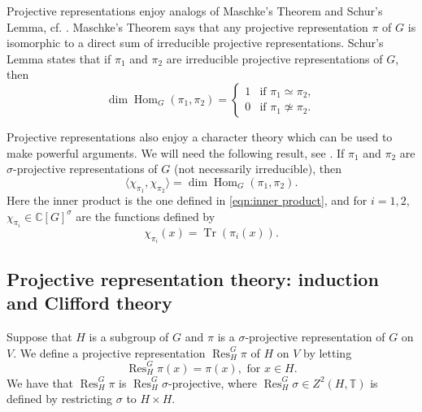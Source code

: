 \documentclass[11pt, oneside, reqno]{amsart}
\newcommand{\bbC}{\mathbb{C}}
\newcommand{\bbT}{\mathbb{T}}
\newcommand{\Tr}{\operatorname{Tr}}
\newcommand{\Hom}{\operatorname{Hom}}
\newcommand{\Res}{\operatorname{Res}}
\theoremstyle{definition}
\theoremstyle{plain}
\theoremstyle{remark}
\begin{document}
Projective representations enjoy analogs of Maschke's Theorem and Schur's Lemma, cf. \cite[Corollary 7.15]{CeccheriniSilbersteinTullio22}. Maschke's Theorem says that any projective representation $\pi$ of $G$ is isomorphic to a direct sum of irreducible projective representations. Schur's Lemma states that if $\pi_1$ and $\pi_2$ are irreducible projective representations of $G$, then
\begin{equation*}
    \dim \Hom_G(\pi_1,\pi_2) =
    \begin{cases}
        1 & \text{if } \pi_1 \simeq \pi_2, \\
        0 & \text{if } \pi_1 \not\simeq \pi_2.
    \end{cases}
\end{equation*}

Projective representations also enjoy a character theory which can be used to make powerful arguments. We will need the following result, see \cite[Proposition 2.2]{Cheng15}. If $\pi_1$ and $\pi_2$ are $\sigma$-projective representations of $G$ (not necessarily irreducible), then
\begin{equation}\label{eqn:inner porduct of characters}
    \langle \chi_{\pi_1}, \chi_{\pi_2} \rangle = \dim \Hom_G(\pi_1,\pi_2).
\end{equation}
Here the inner product is the one defined in \cref{eqn:inner product}, and for $i = 1,2$, $\chi_{\pi_i} \in \bbC[G]^\sigma$ are the functions defined by
\begin{equation*}
    \chi_{\pi_i}(x) = \Tr(\pi_i(x)).
\end{equation*}

\subsection{Projective representation theory: induction and Clifford theory}

Suppose that $H$ is a subgroup of $G$ and $\pi$ is a $\sigma$-projective representation of $G$ on $V$. We define a projective representation $\Res^G_H \pi$ of $H$ on $V$ by letting
\begin{equation*}
    \Res^G_H\pi(x) = \pi(x), \text{ for } x \in H.
\end{equation*}
We have that $\Res^G_H \pi$ is $\Res^G_H\sigma$-projective, where $\Res^G_H\sigma \in Z^2(H,\bbT)$ is defined by restricting $\sigma$ to $H \times H$. 
\end{document}
